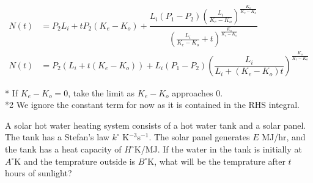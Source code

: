 \documentclass[11pt]{article}
\begin{document}
\begin{solution*}
\begin{align}
            N(t) &= P_2L_i + tP_2 (K_e - K_o) + \dfrac{L_i(P_1 - P_2)\left(\frac{L_i}{K_e - K_o}\right)^{\frac{K_o}{K_e-K_o}}}{ \left(\frac{L_i}{K_e - K_o} + t\right)^{\frac{K_o}{K_e-K_o}}} \\
            N(t) &= P_2(L_i + t(K_e - K_o)) + L_i(P_1 - P_2) \left(\dfrac{L_i}{L_i + (K_e - K_o)t}\right)^{\frac{K_o}{K_e-K_o}}
        \end{align}
        \begin{remark*}[Footnotes.]
        * If $K_e - K_o = 0$, take the limit as $K_e - K_o$ approaches $0$. \\
        *2 We ignore the constant term for now as it is contained in the RHS integral.
        \end{remark*}
    \end{solution*}
    \begin{problem}[Problem 2]
        A solar hot water heating system consists of a hot water tank and a solar panel. The tank has a Stefan's law $k^\circ$ K$^{-3}$s$^{-1}$. The solar panel generates 
        $E$ MJ/hr, and the tank has a heat capacity of $H^\circ$K/MJ. If the water in the tank is initially at $A^\circ$K and the temprature outside is $B^\circ$K,
        what will be the temprature after $t$ hours of sunlight?
    \end{problem}
\end{document}
